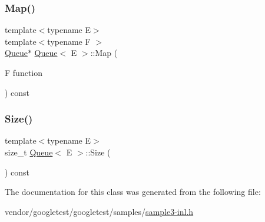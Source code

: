 \mbox{\label{class_queue_a904a696292fc593adc6fd21fb229d760}} 
\subsubsection{\texorpdfstring{Map()}{Map()}}
{\footnotesize\ttfamily template$<$typename E$>$ \\
template$<$typename F $>$ \\
\hyperlink{class_queue}{Queue}$\ast$ \hyperlink{class_queue}{Queue}$<$ E $>$\+::Map (\begin{DoxyParamCaption}\item[{F}]{function }\end{DoxyParamCaption}) const\hspace{0.3cm}{\ttfamily [inline]}}

\mbox{\label{class_queue_abc4d78b5f66041011c5590bf703847b0}} 
\subsubsection{\texorpdfstring{Size()}{Size()}}
{\footnotesize\ttfamily template$<$typename E$>$ \\
size\+\_\+t \hyperlink{class_queue}{Queue}$<$ E $>$\+::Size (\begin{DoxyParamCaption}{ }\end{DoxyParamCaption}) const\hspace{0.3cm}{\ttfamily [inline]}}



The documentation for this class was generated from the following file\+:\begin{DoxyCompactItemize}
\item 
vendor/googletest/googletest/samples/\hyperlink{sample3-inl_8h}{sample3-\/inl.\+h}\end{DoxyCompactItemize}
